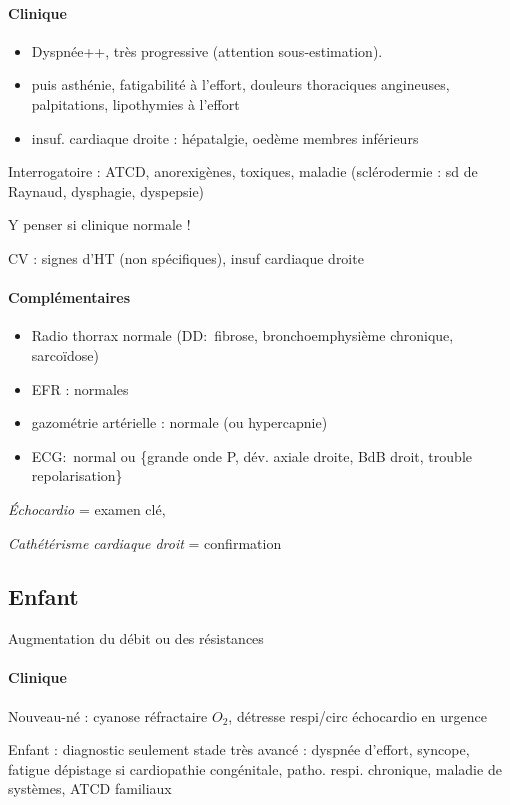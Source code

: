 \documentclass{article}
\begin{document}
\paragraph{Clinique}
\begin{itemize}
  \item Dyspnée++, très progressive (attention sous-estimation). 
  \item puis asthénie, fatigabilité à l'effort, douleurs thoraciques angineuses,
    palpitations, lipothymies à l'effort
  \item insuf. cardiaque droite : hépatalgie, oedème membres inférieurs
\end{itemize}
Interrogatoire : ATCD, anorexigènes, toxiques, maladie (sclérodermie : sd de
Raynaud, dysphagie, dyspepsie)

Y penser si clinique normale !

CV : signes d'HT (non spécifiques), insuf cardiaque droite
\paragraph{Complémentaires}
\begin{itemize}
  \item Radio thorrax normale (DD: fibrose, bronchoemphysième chronique,
    sarcoïdose)
  \item EFR : normales
  \item gazométrie artérielle : normale (ou hypercapnie)
  \item ECG: normal ou \{grande onde P, dév. axiale droite, BdB droit, trouble
    repolarisation\}
\end{itemize}
\textit{Échocardio}  = examen clé, 

\textit{Cathétérisme cardiaque droit}  = confirmation

\subsection{Enfant}

Augmentation du débit ou des résistances

\paragraph{Clinique}
Nouveau-né : cyanose réfractaire $O_2$, détresse respi/circ \thus échocardio en
urgence \danger

Enfant : diagnostic seulement stade très avancé : dyspnée d'effort, syncope,
fatigue
\thus dépistage si cardiopathie congénitale, patho. respi. chronique, maladie de
systèmes, ATCD familiaux
\end{document}

